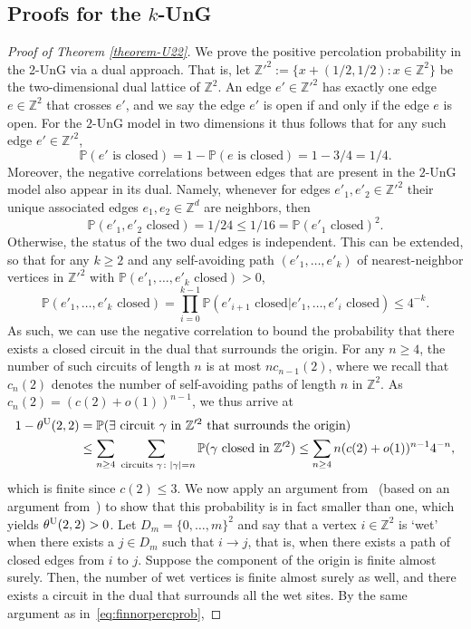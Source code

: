 \documentclass[a4paper, oneside, 11pt]{amsart}
\theoremstyle{definition}
\renewcommand{\P}{\mathbb{P}}
\newcommand{\1}{\mathbbm{1}}
\newcommand{\0}{\mathbf{o}}
\newcommand{\Z}{\mathbb{Z}}
\newcommand*{\be}{\begin{equation}}
\newcommand*{\ee}{\end{equation}}
\newcommand*{\ba}{\begin{aligned}}
\newcommand*{\ea}{\end{aligned}}
\numberwithin{equation}{section}
\begin{document}
\subsection{Proofs for the $k$-UnG}
\begin{proof}[Proof of Theorem \ref{theorem-U22}]
    We prove the positive percolation probability in the 2-UnG via a dual approach. That is, let $\Z'^2:=\{x+(1/2,1/2): x\in \Z^2\}$ be the two-dimensional dual lattice of $\Z^2$. An edge $e'\in\Z'^2$ has exactly one edge $e\in\Z^2$ that crosses $e'$, and we say the edge $e'$ is open if and only if the edge $e$ is open. For the $2$-UnG model in two dimensions it thus follows that for any such edge $e'\in\Z'^2$, 
    \be 
    \P(e' \text{ is closed})=1-\P(e\text{ is closed})=1-3/4=1/4.
    \ee 
    Moreover, the negative correlations between edges that are present in the $2$-UnG model also appear in its dual. Namely, whenever for edges $e'_1,e'_2\in\Z'^2$ their unique associated edges $e_1,e_2\in\Z^d$ are neighbors, then
    \be 
    \P(e'_1,e'_2\text{ closed})=1/24\leq 1/16=\P(e'_1\text{ closed})^2.
    \ee 
    Otherwise, the status of the two dual edges is independent.
    This can be extended, so that for any $k\geq 2$ and any self-avoiding path $(e'_1,\dots, e'_k)$ of nearest-neighbor vertices in $\Z'^2$ with $\P(e'_1,\dots, e'_k\text{ closed})>0$, 
    \be 
    \P(e'_1,\dots, e'_k\text{ closed})= \prod_{i=0}^{k-1}\P(e'_{i+1}\text{ closed}|e'_1,\dots,e'_i\text{ closed})\le 4^{-k}.
    \ee 
    As such, we can use the negative correlation to bound the probability that there exists a closed circuit in the dual that surrounds the origin. For any $n\geq 4$, the number of such circuits of length $n$ is at most $nc_{n-1}(2)$, where we recall that $c_n(2)$ denotes the number of self-avoiding paths of length $n$ in $\Z^2$. As $c_n(2)=(c(2)+o(1))^{n-1}$, we thus arrive at 
    \be \ba\label{eq:finnorpercprob}
    1-\theta^{\rm U}(2,2)&=\P(\exists \text{ circuit }\gamma \text{ in }\Z'^2\text{ that surrounds the origin})\\
    &\leq \sum_{n\ge4} \sum_{\text{ circuits }\gamma\colon|\gamma|=n}\P(\gamma\text{ closed in }\Z'^2)\leq \sum_{n\ge4} n(c(2)+o(1))^{n-1} 4^{-n}, 
    \ea \ee 
    which is finite since $c(2)\leq 3$. We now apply an argument from~\cite{JanSwart} (based on an argument from~\cite{Durr88})  to show that this probability is in fact smaller than one, which yields $\theta^{\rm U}(2,2)>0$. Let $D_m=\{0,\ldots, m\}^2$ and say that a vertex $i\in \Z^2$ is `wet' when there exists a $j\in D_m$ such that $i\to j$, that is, when there exists a path of closed edges from $i$ to $j$. Suppose the component of the origin is finite almost surely. Then, the number of wet vertices is finite almost surely as well, and there exists a circuit in the dual that surrounds all the wet sites. By the same argument as in~\eqref{eq:finnorpercprob}, 

\end{proof}
\end{document}
